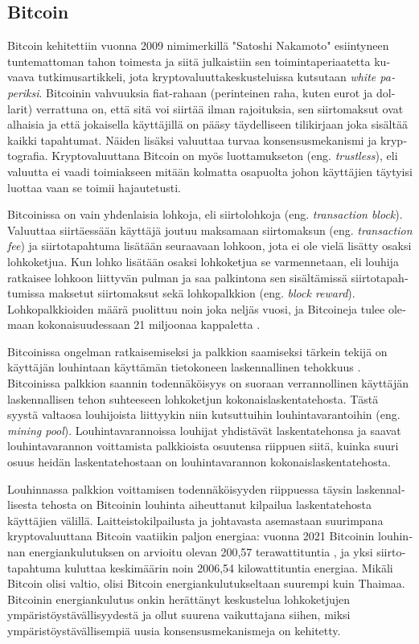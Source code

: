\subsection{Bitcoin\label{bitcoin}}
\begin{otherlanguage}{english}

Bitcoin kehitettiin vuonna 2009 nimimerkillä "Satoshi Nakamoto" esiintyneen tuntemattoman tahon toimesta ja siitä julkaistiin sen toimintaperiaatetta \cite{bitcoin1, satoshibitcoin} kuvaava tutkimusartikkeli, jota kryptovaluuttakeskusteluissa kutsutaan \textit{white paperiksi}. Bitcoinin vahvuuksia fiat-rahaan (perinteinen raha, kuten eurot ja dollarit) verrattuna on, että sitä voi siirtää ilman rajoituksia, sen siirtomaksut ovat alhaisia ja että jokaisella käyttäjillä on pääsy täydelliseen tilikirjaan joka sisältää kaikki tapahtumat. Näiden lisäksi valuuttaa turvaa konsensusmekanismi ja kryptografia. Kryptovaluuttana Bitcoin on myös luottamukseton (eng. \textit{trustless}), eli valuutta ei vaadi toimiakseen mitään kolmatta osapuolta johon käyttäjien täytyisi luottaa vaan se toimii hajautetusti.

Bitcoinissa on vain yhdenlaisia lohkoja, eli siirtolohkoja (eng. \textit{transaction block}). Valuuttaa siirtäessään käyttäjä joutuu maksamaan siirtomaksun (eng. \textit{transaction fee}) ja siirtotapahtuma lisätään seuraavaan lohkoon, jota ei ole vielä lisätty osaksi lohkoketjua. Kun lohko lisätään osaksi lohkoketjua se varmennetaan, eli louhija ratkaisee lohkoon liittyvän pulman ja saa palkintona sen sisältämissä siirtotapahtumissa maksetut siirtomaksut sekä lohkopalkkion (eng. \textit{block reward}). Lohkopalkkioiden määrä puolittuu noin joka neljäs vuosi, ja Bitcoineja tulee olemaan kokonaisuudessaan 21 miljoonaa kappaletta \cite{satoshibitcoin}.

Bitcoinissa ongelman ratkaisemiseksi ja palkkion saamiseksi tärkein tekijä on käyttäjän louhintaan käyttämän tietokoneen laskennallinen tehokkuus \cite{bitcoin1}. Bitcoinissa palkkion saannin todennäköisyys on suoraan verrannollinen käyttäjän laskennallisen tehon suhteeseen lohkoketjun kokonaislaskentatehosta. Tästä syystä valtaosa louhijoista liittyykin niin kutsuttuihin louhintavarantoihin (eng. \textit{mining pool}). Louhintavarannoissa louhijat yhdistävät laskentatehonsa ja saavat louhintavarannon voittamista palkkioista osuutensa riippuen siitä, kuinka suuri osuus heidän laskentatehostaan on louhintavarannon kokonaislaskentatehosta.

Louhinnassa palkkion voittamisen todennäköisyyden riippuessa täysin laskennallisesta tehosta on Bitcoinin louhinta aiheuttanut kilpailua laskentatehosta käyttäjien välillä. Laitteistokilpailusta ja johtavasta asemastaan suurimpana kryptovaluuttana Bitcoin vaatiikin paljon energiaa: vuonna 2021 Bitcoinin louhinnan energiankulutuksen on arvioitu olevan 200,57 terawattituntia \cite{bitcoinenergy}, ja yksi siirtotapahtuma kuluttaa keskimäärin noin 2006,54 kilowattituntia energiaa. Mikäli Bitcoin olisi valtio, olisi Bitcoin energiankulutukseltaan suurempi kuin Thaimaa. Bitcoinin energiankulutus onkin herättänyt keskustelua lohkoketjujen ympäristöystävällisyydestä ja ollut suurena vaikuttajana siihen, miksi ympäristöystävällisempiä uusia konsensusmekanismeja on kehitetty.


\end{otherlanguage}
